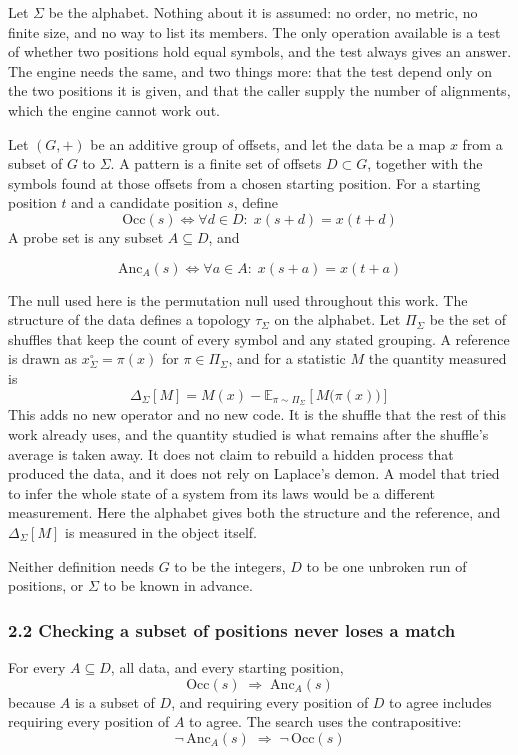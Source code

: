 Let \(\Sigma\) be the alphabet. Nothing about it is assumed: no order, no metric, no finite size, and no way to list its members. The only operation available is a test of whether two positions hold equal symbols, and the test always gives an answer. The engine needs the same, and two things more: that the test depend only on the two positions it is given, and that the caller supply the number of alignments, which the engine cannot work out.

Let \((G,+)\) be an additive group of offsets, and let the data be a map \(x\) from a subset of \(G\) to \(\Sigma\). A pattern is a finite set of offsets \(D \subset G\), together with the symbols found at those offsets from a chosen starting position. For a starting position \(t\) and a candidate position \(s\), define
\[
  \mathrm{Occ}(s) \iff \forall d \in D:\; x(s+d) = x(t+d)
\]
A probe set is any subset \(A \subseteq D\), and

\[
  \mathrm{Anc}_A(s) \iff \forall a \in A:\; x(s+a) = x(t+a)
\]

The null used here is the permutation null used throughout this work. The structure of the data defines a topology \(\tau_\Sigma\) on the alphabet. Let \(\Pi_\Sigma\) be the set of shuffles that keep the count of every symbol and any stated grouping. A reference is drawn as \(x^\circ_\Sigma = \pi(x)\) for \(\pi \in \Pi_\Sigma\), and for a statistic \(M\) the quantity measured is
\[
  \Delta_\Sigma[M] = M(x) - \mathbb{E}_{\pi \sim \Pi_\Sigma}\!\left[M\bigl(\pi(x)\bigr)\right]
\]
This adds no new operator and no new code. It is the shuffle that the rest of this work already uses, and the quantity studied is what remains after the shuffle's average is taken away. It does not claim to rebuild a hidden process that produced the data, and it does not rely on Laplace's demon. A model that tried to infer the whole state of a system from its laws would be a different measurement. Here the alphabet gives both the structure and the reference, and \(\Delta_\Sigma[M]\) is measured in the object itself.

Neither definition needs \(G\) to be the integers, \(D\) to be one unbroken run of positions, or \(\Sigma\) to be known in advance.

\subsubsection{2.2 Checking a subset of positions never loses a match}

For every \(A \subseteq D\), all data, and every starting position,
\[
  \mathrm{Occ}(s) \;\Longrightarrow\; \mathrm{Anc}_A(s)
\]
because \(A\) is a subset of \(D\), and requiring every position of \(D\) to agree includes requiring every position of \(A\) to agree. The search uses the contrapositive:
\[
  \neg\,\mathrm{Anc}_A(s) \;\Longrightarrow\; \neg\,\mathrm{Occ}(s)
\]

